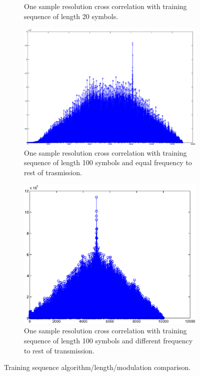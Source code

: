 \documentclass[12pt,a4paper,openright]{article}
\begin{document}
\begin{figure}[h]
\begin{subfigure}[b]{0.5\linewidth}
    \caption{One sample resolution cross correlation with training sequence of length 20 symbols.} 
    \label{fig7:b} 
    \vspace{4ex}
  \end{subfigure} 
  \quad
  \begin{subfigure}[b]{0.5\linewidth}
    \centering
    \includegraphics[width=1\linewidth]{100eq.eps} 
    \caption{One sample resolution cross correlation with training sequence of length 100 symbols and equal frequency to rest of trasmission.} 
    \label{fig7:c} 
  \end{subfigure}%
  \quad
  \begin{subfigure}[b]{0.5\linewidth}
    \centering
    \includegraphics[width=1\linewidth]{100dif.eps} 
    \caption{One sample resolution cross correlation with training sequence of length 100 symbols and different frequency to rest of transmission.} 
    \label{fig7:d} 
  \end{subfigure} 
  \caption{Training sequence algorithm/length/modulation comparison.}
  \label{tscomp} 
\end{figure}
   
\end{document}
